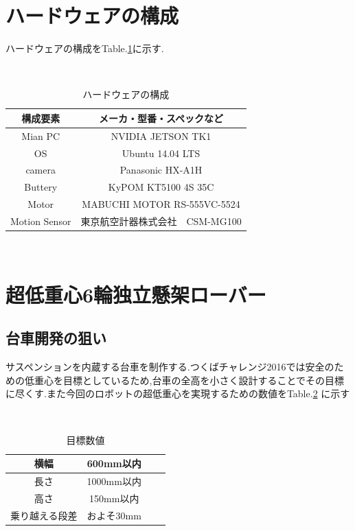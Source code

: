\documentclass[a4paper]{jarticle}
\begin{document}
\section{ハードウェアの構成}
ハードウェアの構成をTable.\ref{tab:op}に示す.
\begin{table}[htp]
 　\begin{center}
    \caption{ハードウェアの構成}
  \begin{tabular}{|c|c|} \hline
    構成要素 & メーカ・型番・スペックなど \\ \hline
    Mian PC & NVIDIA JETSON TK1 \\ \hline
    OS & Ubuntu 14.04 LTS \\ \hline
    camera & Panasonic HX-A1H \\ \hline
    Buttery & KyPOM KT5100 4S 35C \\ \hline
    Motor & MABUCHI MOTOR RS-555VC-5524 \\ \hline
    Motion Sensor & 東京航空計器株式会社　CSM-MG100\\ \hline

  \end{tabular}
　   \label{tab:op}
  \end{center}
\end{table}


\section{超低重心6輪独立懸架ローバー}
\subsection{台車開発の狙い}
サスペンションを内蔵する台車を制作する.つくばチャレンジ2016では安全のための低重心を目標としているため,台車の全高を小さく設計することでその目標に尽くす.また今回のロボットの超低重心を実現するための数値をTable.\ref{tab:joken} に示す
\begin{table}[htp]
 　\begin{center}
    \caption{目標数値}
  \begin{tabular}{|c|c|c|c|} \hline
横幅 & 600mm以内  \\  \hline
長さ & 1000mm以内\\ \hline
高さ & 150mm以内 \\ \hline
    乗り越える段差 & およそ30mm  \\ \hline
  \end{tabular}
　   \label{tab:joken}
  \end{center}
\end{table}
\end{document}
